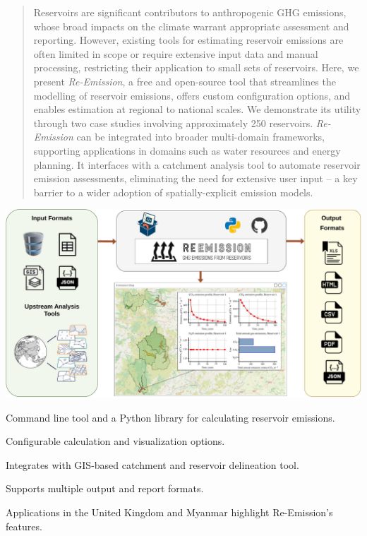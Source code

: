 \documentclass[final,1p,times]{elsarticle}
\begin{document}
\begin{frontmatter}
\begin{abstract}
Reservoirs are significant contributors to anthropogenic \ac{GHG} emissions, whose broad impacts on the climate warrant appropriate assessment and reporting. 
However, existing tools for estimating reservoir emissions are often limited in scope or require extensive input data and manual processing, restricting their application to small sets of reservoirs.
Here, we present \emph{Re-Emission}, a free and open-source tool that streamlines the modelling of reservoir emissions, offers custom configuration options, and enables estimation at regional to national scales.  
We demonstrate its utility through two case studies involving approximately 250 reservoirs.
\emph{Re-Emission} can be integrated into broader multi-domain frameworks, supporting applications in domains such as water resources and energy planning. 
It interfaces with a catchment analysis tool to automate reservoir emission assessments, eliminating the need for extensive user input -- a key barrier to a wider adoption of spatially-explicit emission models.
\end{abstract}

\begin{graphicalabstract}
\includegraphics[width=1\textwidth]{figures/graphical_abstract_new.drawio-compressed.pdf}
\end{graphicalabstract}

\begin{highlights}
\item Command line tool and a Python library for calculating reservoir emissions.
\item Configurable calculation and visualization options.
\item Integrates with \acs{GIS}-based catchment and reservoir delineation tool.
\item Supports multiple output and report formats.
\item Applications in the United Kingdom and Myanmar highlight Re-Emission's features.
\end{highlights}


\end{frontmatter}
\end{document}
